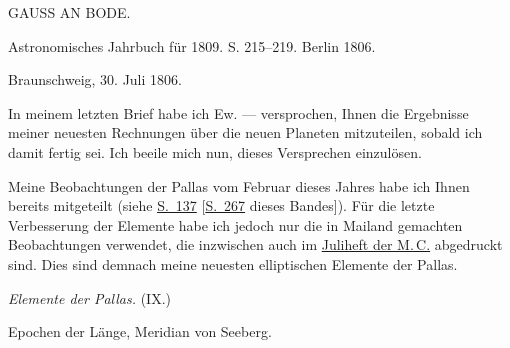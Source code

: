 \clearpage
{}
\hypertarget{native-283-lower}{}
\begin{center}
GAUSS AN BODE.
\end{center}

\begin{center}
Astronomisches Jahrbuch für 1809. S. 215–219. Berlin 1806.
\end{center}

\begin{flushright}
Braunschweig, 30. Juli 1806.
\end{flushright}

\par\indent In meinem letzten Brief habe ich Ew. --- versprochen, Ihnen die Ergebnisse meiner neuesten Rechnungen über die neuen Planeten mitzuteilen, sobald ich damit fertig sei. Ich beeile mich nun, dieses Versprechen einzulösen.

\par\indent Meine Beobachtungen der Pallas vom Februar dieses Jahres habe ich Ihnen bereits mitgeteilt (siehe \href{https://www.digitale-sammlungen.de/en/view/bsb10538338?page=147}{S.~137} [\hyperlink{native-272}{S.~267} dieses Bandes]). Für die letzte Verbesserung der Elemente habe ich jedoch nur die in Mailand gemachten Beobachtungen verwendet, die inzwischen auch im \href{https://www.digitale-sammlungen.de/en/view/bsb10538606?page=100}{Juliheft der M.\,C.} abgedruckt sind. Dies sind demnach meine neuesten elliptischen Elemente der Pallas.

\begin{center}
\emph{Elemente der Pallas.} (IX.)

Epochen der Länge, Meridian von Seeberg.
\end{center}

